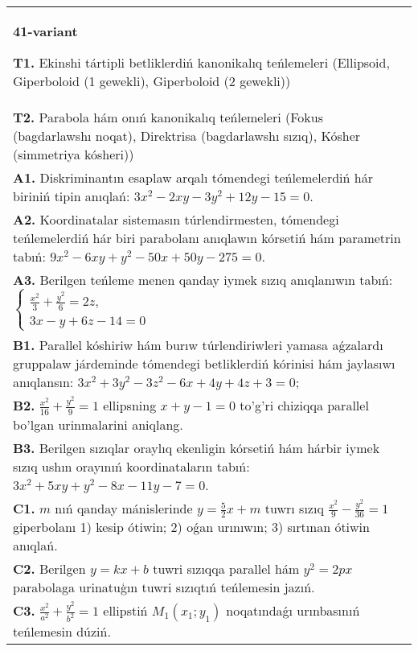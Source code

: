 \documentclass{article}
\begin{document}
\begin{tabular}{m{17cm}}
\textbf{41-variant}
\newline

\textbf{T1.} Ekinshi tártipli betliklerdiń kanonikalıq teńlemeleri (Ellipsoid, Giperboloid (1 gewekli), Giperboloid (2 gewekli)) \\
\textbf{T2.} Parabola hám onıń kanonikalıq teńlemeleri (Fokus (bagdarlawshı noqat), Direktrisa (bagdarlawshı sızıq), Kósher (simmetriya kósheri)) \\
\textbf{A1.} Diskriminantın esaplaw arqalı tómendegi teńlemelerdiń hár biriniń tipin anıqlań: $3 x^2-2 x y-3 y^2+12 y-15=0$. \\
\textbf{A2.} Koordinatalar sistemasın túrlendirmesten, tómendegi teńlemelerdiń hár biri parabolanı anıqlawın kórsetiń hám parametrin tabıń: $9 x^2-6 x y+y^2-50 x+50 y-275=0$. \\
\textbf{A3.} Berilgen teńleme menen qanday iymek sızıq anıqlanıwın tabıń: $\left\{\begin{array}{l}\frac{x^2}{3}+\frac{y^2}{6}=2 z, \\ 3 x-y+6 z-14=0\end{array}\right.$ \\
\textbf{B1.} Parallel kóshiriw hám burıw túrlendiriwleri yamasa aǵzalardı gruppalaw járdeminde tómendegi betliklerdiń kórinisi hám jaylasıwı anıqlansın: $3 x^2+3 y^2-3 z^2-6 x+4 y+4 z+3=0$; \\
\textbf{B2.} $\frac{x^2}{16}+\frac{y^2}{9}=1$ ellipsning $x+y-1=0$ to'g'ri chiziqqa parallel bo'lgan urinmalarini aniqlang. \\
\textbf{B3.} Berilgen sızıqlar oraylıq ekenligin kórsetiń hám hárbir iymek sızıq ushın orayınıń koordinataların tabıń: $3x^2+5xy+y^2-8x-11y-7=0$. \\
\textbf{C1.} $m$ nıń qanday mánislerinde $y=\frac{5}{2} x+m$ tuwrı sızıq $\frac{x^2}{9}-\frac{y^2}{36}=1$ giperbolanı 1) kesip ótiwin; 2) oǵan urınıwın; 3) sırtınan ótiwin anıqlań. \\
\textbf{C2.} Berilgen $y=k x+b$ tuwri sızıqqa parallel hám $y^2=2 p x$ parabolaga urinatuģın tuwri sızıqtıń teńlemesin jazıń. \\
\textbf{C3.} $\frac{x^2}{a^2}+\frac{y^2}{b^2}=1$ ellipstiń $M_1 (x_1; y_1) $ noqatındaǵı urınbasınıń teńlemesin dúziń. \\

\end{tabular}
\vspace{1cm}
\end{document}
